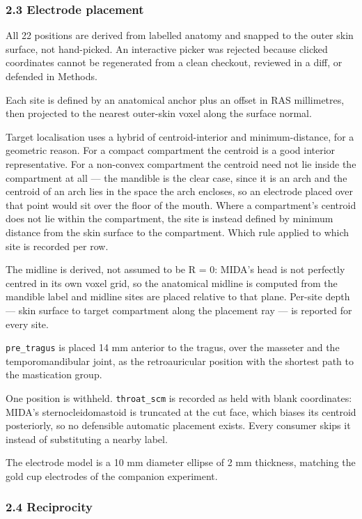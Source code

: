 \documentclass[
  11pt,
  letterpaper,
]{article}
\begin{document}
\subsubsection{2.3 Electrode placement}\label{electrode-placement}

All 22 positions are derived from labelled anatomy and snapped to the outer skin
surface, not hand-picked. An interactive picker was rejected because clicked
coordinates cannot be regenerated from a clean checkout, reviewed in a diff, or
defended in Methods.

Each site is defined by an anatomical anchor plus an offset in RAS millimetres,
then projected to the nearest outer-skin voxel along the surface normal.

Target localisation uses a hybrid of centroid-interior and minimum-distance, for
a geometric reason. For a compact compartment the centroid is a good interior
representative. For a non-convex compartment the centroid need not lie inside
the compartment at all --- the mandible is the clear case, since it is an arch and
the centroid of an arch lies in the space the arch encloses, so an electrode
placed over that point would sit over the floor of the mouth. Where a
compartment's centroid does not lie within the compartment, the site is instead
defined by minimum distance from the skin surface to the compartment. Which rule
applied to which site is recorded per row.

The midline is derived, not assumed to be R = 0: MIDA's head is not perfectly
centred in its own voxel grid, so the anatomical midline is computed from the
mandible label and midline sites are placed relative to that plane. Per-site
depth --- skin surface to target compartment along the placement ray --- is reported
for every site.

\texttt{pre\_tragus} is placed 14 mm anterior to the tragus, over the masseter and the
temporomandibular joint, as the retroauricular position with the shortest path
to the mastication group.

One position is withheld. \texttt{throat\_scm} is recorded as held with blank
coordinates: MIDA's sternocleidomastoid is truncated at the cut face, which
biases its centroid posteriorly, so no defensible automatic placement exists.
Every consumer skips it instead of substituting a nearby label.

The electrode model is a 10 mm diameter ellipse of 2 mm thickness, matching the
gold cup electrodes of the companion experiment.

\subsubsection{2.4 Reciprocity}\label{reciprocity}
\end{document}

